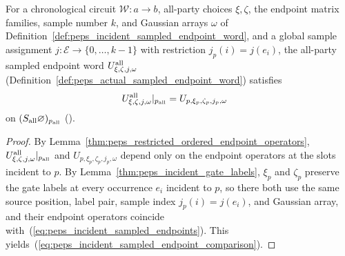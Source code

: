 \begin{lemma}
    \label{thm:peps_incident_sampled_endpoint_comparison}
    \leanok
    For a chronological circuit $\mathcal W:a\to b$, all-party choices $\xi,\zeta$,
    the endpoint matrix families, sample number $k$, and Gaussian arrays $\omega$
    of Definition~\ref{def:peps_incident_sampled_endpoint_word}, and a global
    sample assignment $j:\mathcal E\to\{0,\ldots,k-1\}$ with restriction
    $j_p(i)=j(e_i)$, the all-party sampled endpoint word
    $U^{\rm all}_{\xi,\zeta,j,\omega}$
    (Definition~\ref{def:peps_actual_sampled_endpoint_word}) satisfies
    \begin{align}
        U^{\rm all}_{\xi,\zeta,j,\omega}|_{p_{\rm all}}
         & =U_{p,\xi_p,\zeta_p,j_p,\omega}
        \label{eq:peps_incident_sampled_endpoint_comparison}
    \end{align}
    on $(S_{\rm all}\varnothing)_{p_{\rm all}}$
    (\cite[proof of Theorem~5.2]{OpenAI2026PolynomialPEPS}).
\end{lemma}

\begin{proof}
    \leanok
    By Lemma~\ref{thm:peps_restricted_ordered_endpoint_operators},
    $U^{\rm all}_{\xi,\zeta,j,\omega}|_{p_{\rm all}}$ and
    $U_{p,\xi_p,\zeta_p,j_p,\omega}$ depend only on the endpoint operators at
    the slots incident to $p$. By Lemma~\ref{thm:peps_incident_gate_labels},
    $\xi_p$ and $\zeta_p$ preserve the gate labels at every occurrence $e_i$
    incident to $p$, so there both use the same source position, label pair,
    sample index $j_p(i)=j(e_i)$, and Gaussian array, and their endpoint
    operators coincide with~(\ref{eq:peps_incident_sampled_endpoints}). This
    yields~(\ref{eq:peps_incident_sampled_endpoint_comparison}).
\end{proof}

